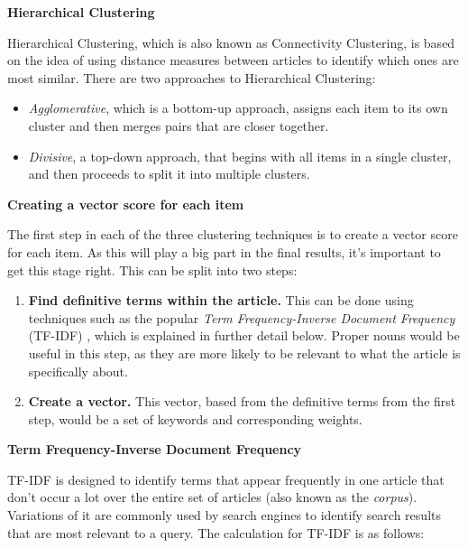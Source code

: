 \documentclass[12pt]{article}
\begin{document}
\textbf{Hierarchical Clustering}

Hierarchical Clustering\cite{hierarchicalClustering}, which is also known as Connectivity Clustering, is based on the idea of using distance measures between articles to identify which ones are most similar. There are two approaches to Hierarchical Clustering: 
 \begin{itemize}
 	\item \emph{Agglomerative}, which is a bottom-up approach, assigns each item to its own cluster and then merges pairs that are closer together. 
	\item \emph{Divisive}, a top-down approach, that begins with all items in a single cluster, and then proceeds to split it into multiple clusters. \\
\end{itemize}

\textbf{Creating a vector score for each item}

The first step in each of the three clustering techniques is to create a vector score for each item. As this will play a big part in the final results, it's important to get this stage right. This can be split into two steps: \\

\begin{enumerate}
	\item \textbf{Find definitive terms within the article.} This can be done using techniques such as the popular \emph{Term Frequency-Inverse Document Frequency}  (TF-IDF) , which is explained in further detail below. Proper nouns would be useful in this step, as they are more likely to be relevant to what the article is specifically about. \\
	\item \textbf{Create a vector.} This vector, based from the definitive terms from the first step, would be a set of keywords and corresponding weights. \\
\end{enumerate}

\textbf{Term Frequency-Inverse Document Frequency}

TF-IDF\cite{tfidf} is designed to identify terms that appear frequently in one article that don't occur a lot over the entire set of articles (also known as the \emph{corpus}). Variations of it are commonly used by search engines to identify search results that are most relevant to a query. The calculation for TF-IDF is as follows: \\
\end{document}
